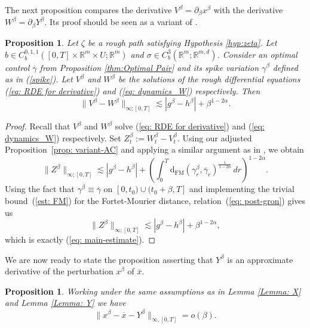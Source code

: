 \documentclass[12pt,reqno]{amsart}
\numberwithin{equation}{section}  %
\newcommand{\1}{{\bf 1}}
\newcommand{\2}{{\bf 2}}
\newcommand{\R}{\mathbb R}
\newcommand{\ga}{\gamma}
\newcommand{\lp}{\left(}
\newcommand{\rp}{\right)}
\newtheorem{proposition}[theorem]{Proposition}
\theoremstyle{remark}
\theoremstyle{remark}
\begin{document}
The next proposition compares the derivative $V^{\beta}=\partial_{\beta}x^{\beta}$ with the derivative $W^{\beta}=\partial_{\beta}Y^{\beta}$. Its proof should be seen as a variant of \cite[Lemma 3.21]{Lew}.
\begin{proposition}\label{prop: variant-TL}
    Let $\zeta$ be a rough path satisfying Hypothesis \ref{hyp:zeta}. Let $b\in C_{b}^{0,1,1}([0,T]\times \R^m \times U;\R^m)$ and $\sigma\in C^{3}_{b}(\R^{m};\R^{m,d})$. Consider an optimal control $\overline{\ga}$ from Proposition \ref{thm:Optimal Pair} and its spike variation $\ga^{\beta}$ defined as in (\ref{spike}). Let $V^{\beta}$ and $W^{\beta}$ be the solutions of the rough differential equations (\ref{eq: RDE for derivative}) and (\ref{eq: dynamics_W}) respectively. Then
    \begin{equation}
      \label{eq: main-estimate}  \|V^{\beta}-W^{\beta}\|_{\infty;[0,T]}\lesssim |g^{\beta}-h^{\beta}|+ \beta^{1-2\alpha}.
    \end{equation}
\end{proposition}
\begin{proof}
    Recall that $V^{\beta}$ and $W^{\beta}$ solve (\ref{eq: RDE for derivative}) and (\ref{eq: dynamics_W}) respectively. 
    Set $Z^{\beta}_{t}:=W^{\beta}_{t}-V^{\beta}_{t}$.
    Using our adjusted Proposition~\ref{prop: variant-AC} and applying a similar argument as in \cite[Lemma 3.21]{Lew}, we obtain
\begin{equation}\label{eq: post-gron}
    \|Z^{\beta}\|_{\infty;[0,T]}\lesssim |g^{\beta}-h^{\beta}| + \lp \int_{0}^{T}\mathrm{d_{FM}}(\ga_{r}^{\beta},\overline{\ga}_{r})^{\frac{1}{1-2\alpha}}\,dr \rp^{1-2\alpha}.
\end{equation}
Using the fact that $\ga^{\beta}\equiv \overline{\ga}$ on $[0,t_{0})\cup (t_{0}+\beta,T]$ and implementing  the trivial bound~(\ref{est: FM}) for the Fortet-Mourier distance, relation~(\ref{eq: post-gron})
gives us
 \begin{equation}
    \|Z^{\beta}\|_{\infty;[0,T]}\lesssim |g^{\beta}-h^{\beta}|+\beta^{1-2\alpha},
\end{equation}
which is exactly (\ref{eq: main-estimate}).
\end{proof}
We are now ready to state the proposition asserting that $Y^{\beta}$ is an approximate derivative of the perturbation $x^{\beta}$ of $\bar{x}$.
\begin{proposition}\label{prop: Prop Z}
Working under the same assumptions as in Lemma \ref{Lemma: X} and Lemma \ref{Lemma: Y} we have
    \begin{equation}\label{Pontry-3}\|x^{\beta}-\overline{x}-Y^{\beta}\|_{\infty,[0,T]}=o(\beta).\end{equation}
\end{proposition}
\end{document}
